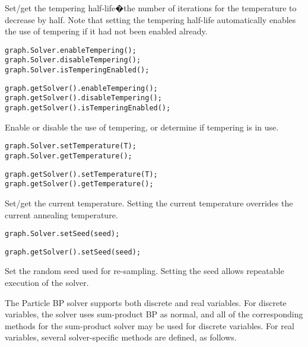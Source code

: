 Set/get the tempering half-life�the number of iterations for the temperature to decrease by half. Note that setting the tempering half-life automatically enables the use of tempering if it had not been enabled already.

\ifmatlab
\begin{lstlisting}
graph.Solver.enableTempering();
graph.Solver.disableTempering();
graph.Solver.isTemperingEnabled();
\end{lstlisting}
\fi

\ifjava
\begin{lstlisting}
graph.getSolver().enableTempering();
graph.getSolver().disableTempering();
graph.getSolver().isTemperingEnabled();
\end{lstlisting}
\fi

Enable or disable the use of tempering, or determine if tempering is in use.

\ifmatlab
\begin{lstlisting}
graph.Solver.setTemperature(T);
graph.Solver.getTemperature();
\end{lstlisting}
\fi

\ifjava
\begin{lstlisting}
graph.getSolver().setTemperature(T);
graph.getSolver().getTemperature();
\end{lstlisting}
\fi

Set/get the current temperature. Setting the current temperature overrides the current annealing temperature.

\ifmatlab
\begin{lstlisting}
graph.Solver.setSeed(seed);
\end{lstlisting}
\fi

\ifjava
\begin{lstlisting}
graph.getSolver().setSeed(seed);
\end{lstlisting}
\fi

Set the random seed used for re-sampling. Setting the seed allows repeatable execution of the solver.


The Particle BP solver supports both discrete and real variables. For discrete variables, the solver uses sum-product BP as normal, and all of the corresponding methods for the sum-product solver may be used for discrete variables. For real variables, several solver-specific methods are defined, as follows.

\label{sec:ParticleBPRealVariableSpecificMethods}

